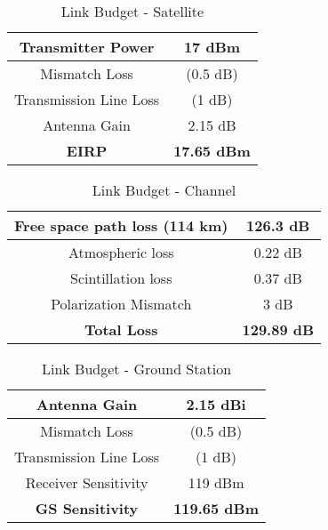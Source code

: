 \begin{table}[!htb]
  \centering
  \renewcommand{\arraystretch}{1.2}
  \begin{tabular}{ |c|c| }
  \hline
  Transmitter Power             & 17 dBm                    \\ \hline
  Mismatch Loss                 & (0.5 dB)                 \\ \hline
  Transmission Line Loss        & (1 dB)                  \\ \hline
  Antenna Gain                  & 2.15 dB                   \\ \hline \hline
  \textbf{EIRP}                 & \textbf{17.65 dBm}        \\ \hline
  \end{tabular}
  \caption{Link Budget - Satellite}
  \label{tab:link_budget_satellite}
\end{table}

\begin{table}[!htb]
  \centering
  \renewcommand{\arraystretch}{1.2}
  \begin{tabular}{ |c|c| }
  \hline
  Free space path loss (114 km) & 126.3 dB                  \\ \hline
  Atmospheric loss              & 0.22 dB                   \\ \hline
  Scintillation loss            & 0.37 dB                   \\ \hline
  Polarization Mismatch         & 3 dB                      \\ \hline
  \textbf{Total Loss}           & \textbf{129.89 dB}         \\ \hline
  \end{tabular}
  \caption{Link Budget - Channel}
  \label{tab:link_budget_channel}
\end{table}

\begin{table}[!htb]
  \centering
  \renewcommand{\arraystretch}{1.2}
  \begin{tabular}{ |c|c| }
  \hline
  Antenna Gain                  & 2.15 dBi                \\ \hline
  Mismatch Loss                 & (0.5 dB)                \\ \hline
  Transmission Line Loss        & (1 dB)                  \\ \hline
  Receiver Sensitivity          & 119 dBm                 \\ \hline
  \textbf{GS Sensitivity}       & \textbf{119.65 dBm}     \\ \hline
  \end{tabular}
  \caption{Link Budget - Ground Station}
  \label{tab:link_budget_gs}
\end{table}

